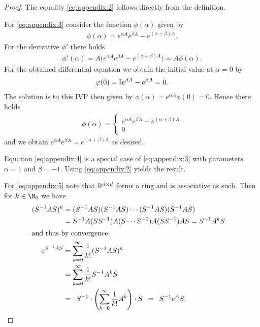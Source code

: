 \begin{proof}
	The equality \ref{eq:appendix:2} follows directly from the definition.
    
    For \ref{eq:appendix:3} consider the function $\phi(\alpha)$ given by
    \begin{gather*}
	\phi(\alpha) = e^{\alpha A}e^{\beta A} - e^{(\alpha + \beta) A}.
	\end{gather*}
    For the derivative $\phi '$ there holds
    \begin{gather*}
	\phi'(\alpha) = A\big(e^{\alpha A}e^{\beta A}
		- e^{(\alpha + \beta) A} \big) = A \phi(\alpha).
	\end{gather*}
    For the obtained differential equation we obtain the initial value at
	$\alpha = 0$ by
    \begin{gather*}
	\varphi(0) = \mathbb I e^{\beta A} - e^{\beta A} = 0.
	\end{gather*}
    The solution is to this IVP then given by $\phi(\alpha) = e^{\alpha A}
		\phi(0) = 0$. Hence there holds
    \begin{gather*}
	\phi(\alpha) = \begin{cases}
	 e^{\alpha A}e^{\beta A} - e^{(\alpha + \beta) A} \\
     0
	\end{cases}
	\end{gather*}
    and we obtain $e^{\alpha A}e^{\beta A} = e^{(\alpha + \beta) A}$
		as desired.
    
    Equation \ref{eq:appendix:4} is a special case of \ref{eq:appendix:3}
	with parameters $\alpha=1$ and $\beta = -1$. Using \ref{eq:appendix:2}
	yields the result.
    
    For \ref{eq:appendix:5} note that $\mathbb R^{d \times d}$ forms a ring and is
	associative as such. Then for $k \in \N_0$ we have
    \begin{align*}
	(S^{-1} AS)^k &= (S^{-1} AS) (S^{-1} AS) \cdots (S^{-1} AS)(S^{-1} AS) \\
		&= S^{-1} A (SS^{-1}) A (S \cdots S^{-1}) A (SS^{-1}) AS = S^{-1} A^k S& \\
			\intertext{and thus by convergence}
	e^{S^{-1}AS} &= \sum_{k=0}^\infty \frac{1}{k!} (S^{-1}AS)^k \\
		&= \sum_{k=0}^\infty\frac{1}{k!} S^{-1} A^k S \\
		&= \enskip S^{-1} \cdot \left( \sum_{k=0}^\infty \frac{1}{k!} A^k \right)
			\cdot S  \enskip =  \enskip S^{-1} e^A S.&
	\end{align*}
    

\end{proof}
